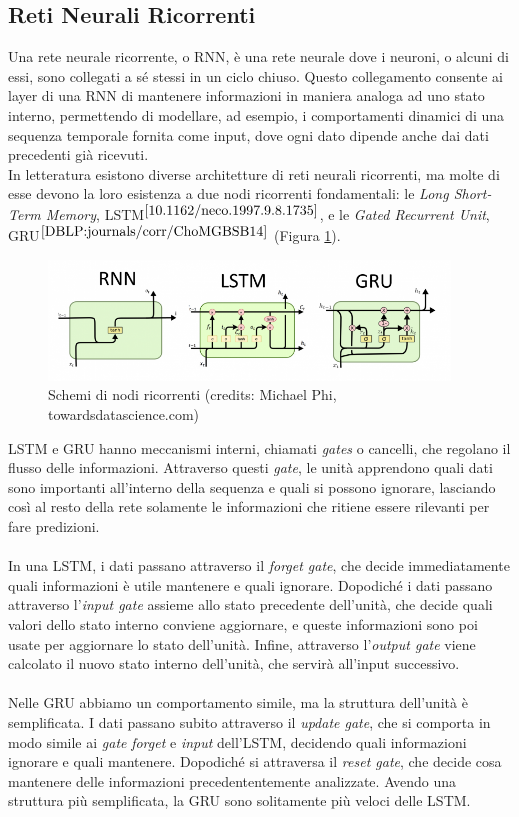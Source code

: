 \subsection{Reti Neurali Ricorrenti}
Una rete neurale ricorrente, o RNN, è una rete neurale dove i neuroni, o alcuni di essi, sono collegati a sé stessi in un ciclo chiuso. Questo collegamento consente ai layer di una RNN di mantenere informazioni in maniera analoga ad uno stato interno, permettendo di modellare, ad esempio, i comportamenti dinamici di una sequenza temporale fornita come input, dove ogni dato dipende anche dai dati precedenti già ricevuti.\\
In letteratura esistono diverse architetture di reti neurali ricorrenti, ma molte di esse devono la loro esistenza a due nodi ricorrenti fondamentali: le \textit{Long Short-Term Memory}, LSTM$^{\cite{10.1162/neco.1997.9.8.1735}}$, e le \textit{Gated Recurrent Unit}, GRU$^{\cite{DBLP:journals/corr/ChoMGBSB14}}$ (Figura \ref{fig:rnnlstmgru}). 
\begin{figure}[h]
	\begin{center}
		\includegraphics[width=0.95\textwidth]{img/rnnlstmgru.png}
		\caption{Schemi di nodi ricorrenti (credits: Michael Phi, towardsdatascience.com)}
		\label{fig:rnnlstmgru}
	\end{center}
\end{figure}
LSTM e GRU hanno meccanismi interni, chiamati \textit{gates} o cancelli, che regolano il flusso delle informazioni. Attraverso questi \textit{gate}, le unità apprendono quali dati sono importanti all'interno della sequenza e quali si possono ignorare, lasciando così al resto della rete solamente le informazioni che ritiene essere rilevanti per fare predizioni.\\\\
In una LSTM, i dati passano attraverso il \textit{forget gate}, che decide immediatamente quali informazioni è utile mantenere e quali ignorare. Dopodiché i dati passano attraverso l'\textit{input gate} assieme allo stato precedente dell'unità, che decide quali valori dello stato interno conviene aggiornare, e queste informazioni sono poi usate per aggiornare lo stato dell'unità. Infine, attraverso l'\textit{output gate} viene calcolato il nuovo stato interno dell'unità, che servirà all'input successivo.\\\\
Nelle GRU abbiamo un comportamento simile, ma la struttura dell'unità è semplificata. I dati passano subito attraverso il \textit{update gate}, che si comporta in modo simile ai \textit{gate} \textit{forget} e \textit{input} dell'LSTM, decidendo quali informazioni ignorare e quali mantenere. Dopodiché si attraversa il \textit{reset gate}, che decide cosa mantenere delle informazioni precedententemente analizzate. Avendo una struttura più semplificata, la GRU sono solitamente più veloci delle LSTM.
